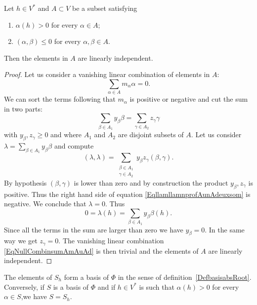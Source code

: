 \begin{lemma}        \label{LemIndepAhVstar}
	Let \( h\in V^*\) and \( A\subset V\) be a subset satisfying
	\begin{enumerate}
		\item
		      \( \alpha(h)>0\) for every \( \alpha\in A\);
		\item
		      \( (\alpha,\beta)\leq 0\) for every \( \alpha,\beta\in A\).
	\end{enumerate}
	Then the elements in \( A\) are linearly independent.
\end{lemma}

\begin{proof}
	Let us consider a vanishing linear combination of elements in \( A\):
	\begin{equation}        \label{EqNullCombinsumAmAuAd}
		\sum_{\alpha\in A}m_{\alpha}\alpha=0.
	\end{equation}
	We can sort the terms following that \( m_{\alpha}\) is positive or negative and cut the sum in two parts:
	\begin{equation}
		\sum_{\beta\in A_1}y_{\beta}\beta=\sum_{\gamma\in A_2}z_{\gamma}\gamma
	\end{equation}
	with \( y_{\beta},z_{\gamma}\geq 0\) and where \( A_1\) and \( A_2\) are disjoint subsets of \( A\). Let us consider \( \lambda=\sum_{\beta\in A_1}y_{\beta}\beta\) and compute
	\begin{equation}        \label{EqllamllamnprofAunAdeuxsom}
		(\lambda,\lambda)=\sum_{\substack{\beta\in A_1\\\gamma\in A_2}}y_{\beta}z_{\gamma}(\beta,\gamma).
	\end{equation}
	By hypothesis \( (\beta,\gamma)\) is lower than zero and by construction the product \( y_{\beta},z_{\gamma}\) is positive. Thus the right hand side of equation \eqref{EqllamllamnprofAunAdeuxsom} is negative. We conclude that \( \lambda=0\). Thus
	\begin{equation}
		0=\lambda(h)=\sum_{\beta\in A_1}y_{\beta}\beta(h).
	\end{equation}
	Since all the terms in the sum are larger than zero we have \( y_{\beta}=0\). In the same way we get \( z_{\gamma}=0\). The vanishing linear combination \eqref{EqNullCombinsumAmAuAd} is then trivial and the elements of \( A\) are linearly independent.
\end{proof}

\begin{proposition}\label{PropSestShsi}
	The elements of \( S_h\) form a basis of \( \Phi\) in the sense of definition~\ref{DefbasisabsRoot}. Conversely, if \( S\) is a basis of \( \Phi\) and if \( h\in V^*\) is such that \( \alpha(h)>0\) for every \( \alpha\in S\),we have \( S=S_h\).
\end{proposition}


